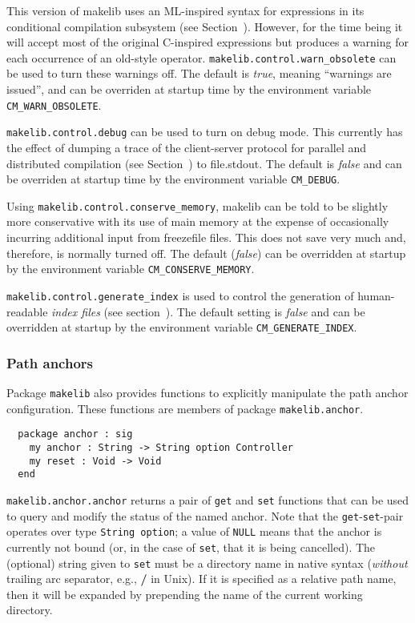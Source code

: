 This version of makelib uses an ML-inspired syntax for expressions in its
conditional compilation subsystem (see Section~).
However, for the time being it will accept most of the original
C-inspired expressions but produces a warning for each occurrence of
an old-style operator. {\tt makelib.control.warn\_obsolete} can be used to
turn these warnings off. The default is {\em true}, meaning ``warnings
are issued'', and can be overriden at startup time by the environment
variable {\tt CM\_WARN\_OBSOLETE}.

{\tt makelib.control.debug} can be used to turn on debug mode.  This
currently has the effect of dumping a trace of the client-server
protocol for parallel and distributed compilation (see
Section~) to file.stdout. The default is {\em
false} and can be overriden at startup time by the environment
variable {\tt CM\_DEBUG}.

Using {\tt makelib.control.conserve\_memory}, makelib can be told to be slightly
more conservative with its use of main memory at the expense of
occasionally incurring additional input from freezefile files.
This does not save very much and, therefore, is normally turned off.
The default ({\em false}) can be overridden at startup by the
environment variable {\tt CM\_CONSERVE\_MEMORY}.

{\tt makelib.control.generate\_index} is used to control the generation of
human-readable {\em index files} (see section~).
The default setting is {\em false} and can be overridden at startup by
the environment variable {\tt CM\_GENERATE\_INDEX}.

\subsubsection{Path anchors}
\label{sec:api:anchors}

Package {\tt makelib} also provides functions to explicitly manipulate
the path anchor configuration.  These functions are members of
package {\tt makelib.anchor}.

\begin{verbatim}
  package anchor : sig
    my anchor : String -> String option Controller
    my reset : Void -> Void
  end
\end{verbatim}

{\tt makelib.anchor.anchor} returns a pair of {\tt get} and {\tt set}
functions that can be used to query and modify the status of the named
anchor.  Note that the {\tt get}-{\tt set}-pair operates over type
{\tt String option}; a value of {\tt NULL} means that the anchor is
currently not bound (or, in the case of {\tt set}, that it is being
cancelled).  The (optional) string given to {\tt set} must be a
directory name in native syntax ({\em without} trailing arc separator,
e.g., {\bf /} in Unix).  If it is specified as a relative path name,
then it will be expanded by prepending the name of the current working
directory.

